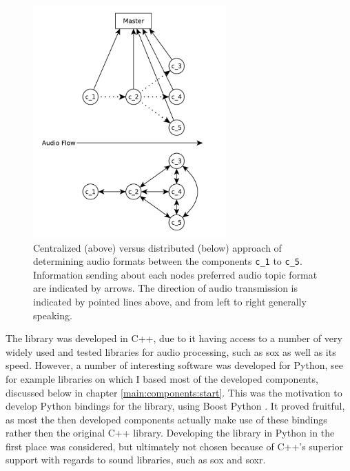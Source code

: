 \begin{figure}[]
	\centering
	\includegraphics[width=0.66\textwidth]{diagrams/lib_central_vs_dist.pdf}
	\caption{Centralized (above) versus distributed (below) approach of determining audio formats between the components \texttt{c\_1} to \texttt{c\_5}.
		Information sending about each nodes preferred audio topic format are indicated by arrows.
		The direction of audio transmission is indicated by pointed lines above, and from left to right generally speaking.}
	\label{pic:main:lib:central_vs_dist}
\end{figure}

The library was developed in C++, due to it having access to a number of very widely used and tested libraries for audio processing, such as \gls{sox} as well as its speed.
However, a number of interesting software was developed for Python, see for example libraries on which I based most of the developed components, discussed below in chapter \ref{main:components:start}.
This was the motivation to develop Python bindings for the library, using Boost Python \cite{Abrahams2003BuildingHS}.
It proved fruitful, as most the then developed components actually make use of these bindings rather then the original C++ library.
Developing the library in Python in the first place was considered, but ultimately not chosen because of C++'s superior support with regards to sound libraries, such as \gls{sox} and \gls{soxr}.


